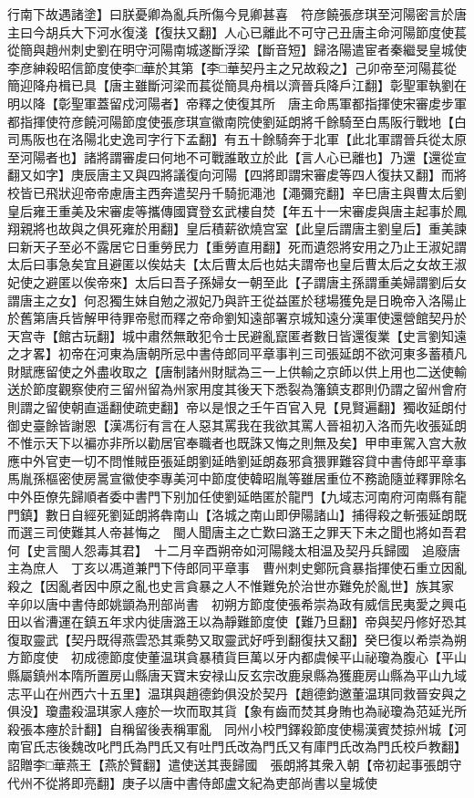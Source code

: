 行南下故遇諸塗】曰朕憂卿為亂兵所傷今見卿甚喜　符彦饒張彦琪至河陽密言於唐主曰今胡兵大下河水復淺【復扶又翻】人心已離此不可守己丑唐主命河陽節度使萇從簡與趙州刺史劉在明守河陽南城遂斷浮梁【斷音短】歸洛陽遣宦者秦繼旻皇城使李彦紳殺昭信節度使李□華於其第【李□華契丹主之兄故殺之】己卯帝至河陽萇從簡迎降舟楫已具【唐主雖斷河梁而萇從簡具舟楫以濟晉兵降戶江翻】彰聖軍執劉在明以降【彰聖軍蓋留戍河陽者】帝釋之使復其所　唐主命馬軍都指揮使宋審䖍步軍都指揮使符彦饒河陽節度使張彦琪宣徽南院使劉延朗將千餘騎至白馬阪行戰地【白司馬阪也在洛陽北史逸司字行下孟翻】有五十餘騎奔于北軍【此北軍謂晉兵從太原至河陽者也】諸將謂審䖍曰何地不可戰誰敢立於此【言人心已離也】乃還【還從宣翻又如字】庚辰唐主又與四將議復向河陽【四將即謂宋審䖍等四人復扶又翻】而將校皆已飛狀迎帝帝慮唐主西奔遣契丹千騎扼澠池【澠彌兖翻】辛巳唐主與曹太后劉皇后雍王重美及宋審䖍等攜傳國寶登玄武樓自焚【年五十一宋審䖍與唐主起事於鳳翔親將也故與之俱死雍於用翻】皇后積薪欲燒宫室【此皇后謂唐主劉皇后】重美諫曰新天子至必不露居它日重勞民力【重勞直用翻】死而遺怨將安用之乃止王淑妃謂太后曰事急矣宜且避匿以俟姑夫【太后曹太后也姑夫謂帝也皇后曹太后之女故王淑妃使之避匿以俟帝來】太后曰吾子孫婦女一朝至此【子謂唐主孫謂重美婦謂劉后女謂唐主之女】何忍獨生妹自勉之淑妃乃與許王從益匿於毬場獲免是日晩帝入洛陽止於舊第唐兵皆解甲待罪帝慰而釋之帝命劉知遠部署京城知遠分漢軍使還營館契丹於天宫寺【館古玩翻】城中肅然無敢犯令士民避亂竄匿者數日皆還復業【史言劉知遠之才畧】初帝在河東為唐朝所忌中書侍郎同平章事判三司張延朗不欲河東多蓄積凡財賦應留使之外盡收取之【唐制諸州財賦為三一上供輸之京師以供上用也二送使輸送於節度觀察使府三留州留為州家用度其後天下悉裂為籓鎮支郡則仍謂之留州會府則謂之留使朝直遥翻使疏吏翻】帝以是恨之壬午百官入見【見賢遍翻】獨收延朗付御史臺餘皆謝恩【漢馮衍有言在人惡其罵我在我欲其罵人晉祖初入洛而先收張延朗不惟示天下以褊亦非所以勸居官奉職者也既誅又悔之則無及矣】甲申車駕入宫大赦應中外官吏一切不問惟賊臣張延朗劉延皓劉延朗姦邪貪猥罪難容貸中書侍郎平章事馬胤孫樞密使房暠宣徽使李專美河中節度使韓昭胤等雖居重位不務詭隨並釋罪除名中外臣僚先歸順者委中書門下别加任使劉延皓匿於龍門【九域志河南府河南縣有龍門鎮】數日自經死劉延朗將犇南山【洛城之南山即伊陽諸山】捕得殺之斬張延朗既而選三司使難其人帝甚悔之　閩人聞唐主之亡歎曰潞王之罪天下未之聞也將如吾君何【史言閩人怨毒其君】　十二月辛酉朔帝如河陽餞太相温及契丹兵歸國　追廢唐主為庶人　丁亥以馮道兼門下侍郎同平章事　曹州刺史鄭阮貪暴指揮使石重立因亂殺之【因亂者因中原之亂也史言貪暴之人不惟難免於治世亦難免於亂世】族其家　辛卯以唐中書侍郎姚顗為刑部尚書　初朔方節度使張希崇為政有威信民夷愛之興屯田以省漕運在鎮五年求内徙唐潞王以為靜難節度使【難乃旦翻】帝與契丹修好恐其復取靈武【契丹既得燕雲恐其乘勢又取靈武好呼到翻復扶又翻】癸巳復以希崇為朔方節度使　初成德節度使董温琪貪暴積貨巨萬以牙内都虞候平山祕瓊為腹心【平山縣屬鎮州本隋所置房山縣唐天寶末安禄山反玄宗改鹿泉縣為獲鹿房山縣為平山九域志平山在州西六十五里】温琪與趙德鈞俱没於契丹【趙德鈞邀董温琪同救晉安與之俱没】瓊盡殺温琪家人瘞於一坎而取其貨【象有齒而焚其身賄也為祕瓊為范延光所殺張本瘞於計翻】自稱留後表稱軍亂　同州小校門鐸殺節度使楊漢賓焚掠州城【河南官氏志後魏改叱門氏為門氏又有吐門氏改為門氏又有庫門氏改為門氏校戶教翻】　詔贈李□華燕王【燕於贒翻】遣使送其喪歸國　張朗將其衆入朝【帝初起事張朗守代州不從將即亮翻】庚子以唐中書侍郎盧文紀為吏部尚書以皇城使

